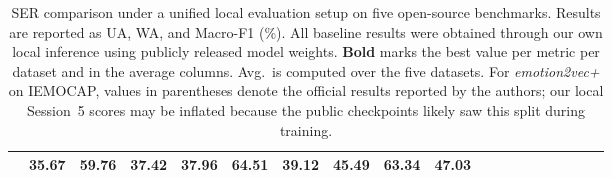 \begin{table}[ht]
{\begin{tabular}{lccc ccc ccc ccc ccc ccc}
& 35.67 & \textbf{59.76} & \textbf{37.42}
& \textbf{37.96} & \textbf{64.51} & \textbf{39.12}
& \textbf{45.49} & \textbf{63.34} & \textbf{47.03} \\
\bottomrule
\end{tabular}
}
\caption{SER comparison under a unified local evaluation setup on five open-source benchmarks. Results are reported as UA, WA, and Macro-F1 (\%). All baseline results were obtained through our own local inference using publicly released model weights. \textbf{Bold} marks the best value per metric per dataset and in the average columns. Avg.\ is computed over the five datasets. For \textit{emotion2vec+} on IEMOCAP, values in parentheses denote the official results reported by the authors; our local Session~5 scores may be inflated because the public checkpoints likely saw this split during training.}
\label{tab:ser_comparison}
\end{table}
